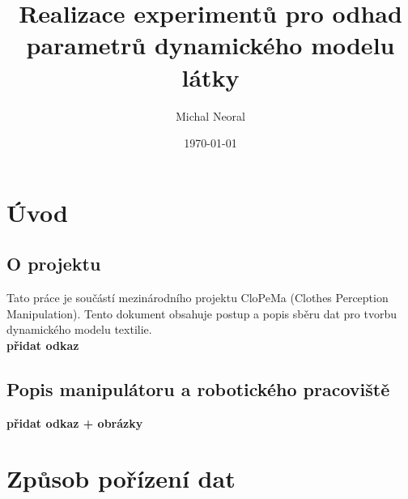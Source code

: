\documentclass[10pt,a4paper,titlepage,oneside]{report}
\begin{document}
\title{Realizace experimentů pro odhad parametrů dynamického modelu látky}
\author{Michal Neoral}
\date{\today{}}
\maketitle

\thispagestyle{fancy}

\chapter{Úvod}

\section{O projektu}
Tato práce je součástí mezinárodního projektu CloPeMa (Clothes Perception Manipulation). Tento dokument obsahuje postup a popis sběru dat pro tvorbu dynamického modelu textilie.\\
\textbf{přidat odkaz}

\section{Popis manipulátoru a robotického pracoviště}
\textbf{přidat odkaz + obrázky}


\chapter{Způsob pořízení dat}
\end{document}
